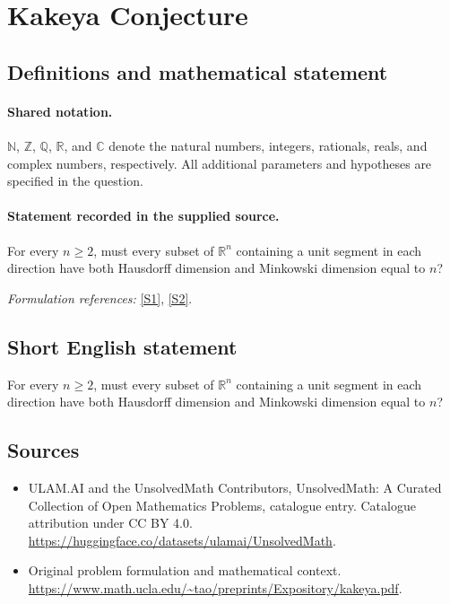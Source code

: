 \documentclass[11pt]{article}
\newcommand{\sref}[2]{\hyperlink{source:#1:#2}{[S#2]}}
\begin{document}
\section{Kakeya Conjecture}\label{statement}

\subsection{Definitions and mathematical statement}

\paragraph{Shared notation.}$\mathbb N$, $\mathbb Z$, $\mathbb Q$, $\mathbb R$, and $\mathbb C$ denote the natural numbers, integers, rationals, reals, and complex numbers, respectively. All additional parameters and hypotheses are specified in the question.


\paragraph{Statement recorded in the supplied source.}
For every $n\geq2$, must every subset of $\mathbb R^n$ containing a unit segment in each direction have both Hausdorff dimension and Minkowski dimension equal to $n$?
\par\smallskip\textit{Formulation references:} \sref{statement}{1}, \sref{statement}{2}.
\subsection{Short English statement}
For every $n\geq2$, must every subset of $\mathbb R^n$ containing a unit segment in each direction have both Hausdorff dimension and Minkowski dimension equal to $n$?
\subsection{Sources}
\begin{itemize}
\item[\hypertarget{source:statement:1}{S1}] ULAM.AI and the UnsolvedMath Contributors, UnsolvedMath: A Curated Collection of Open Mathematics Problems, catalogue entry. Catalogue attribution under CC BY 4.0.
\url{https://huggingface.co/datasets/ulamai/UnsolvedMath}.
\item[\hypertarget{source:statement:2}{S2}] Original problem formulation and mathematical context.
\url{https://www.math.ucla.edu/~tao/preprints/Expository/kakeya.pdf}.
\end{itemize}
\label{end:statement}
\end{document}
